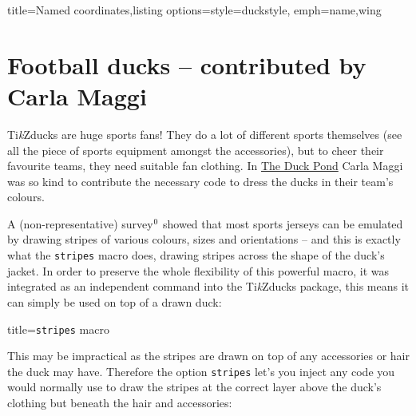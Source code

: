 \documentclass[parskip=half]{scrartcl}
\newcommand{\tikzducks}{Ti\emph{k}Zducks\xspace}
\begin{document}
\begin{tcblisting}{title={Named coordinates},listing options={style={duckstyle}, emph={name,wing}}}
\end{tcblisting}

\clearpage
\section{Football ducks -- contributed by Carla Maggi}
\label{sec:footballducks}

\tikzducks are huge sports fans! They do a lot of different sports themselves (see all the piece of sports equipment amongst the accessories), but to cheer their favourite teams, they need suitable fan clothing. In \href{https://tex.stackexchange.com/a/387126/36296}{The Duck Pond} Carla Maggi was so kind to contribute the necessary code to dress the ducks in their team's colours.

\addtocounter{footnote}{1}
A (non-representative) survey$^\thefootnote$ showed that most sports jerseys can be emulated by drawing stripes of various colours, sizes and orientations -- and this is exactly what the \lstinline|stripes| macro does, drawing stripes across the shape of the duck's jacket. In order to preserve the whole flexibility of this powerful macro, it was integrated as an independent command into the \tikzducks package, this means it can simply be used on top of a drawn duck:

\begin{tcblisting}{title={\texttt{stripes} macro}}
\begin{tikzpicture}
	\duck
	\stripes
\end{tikzpicture}
\end{tcblisting}

This may be impractical as the stripes are drawn on top of any accessories or hair the duck may have. Therefore the option \lstinline|stripes| let's you inject any code you would normally use to draw the stripes at the correct layer above the duck's clothing but beneath the hair and accessories:
\end{document}
